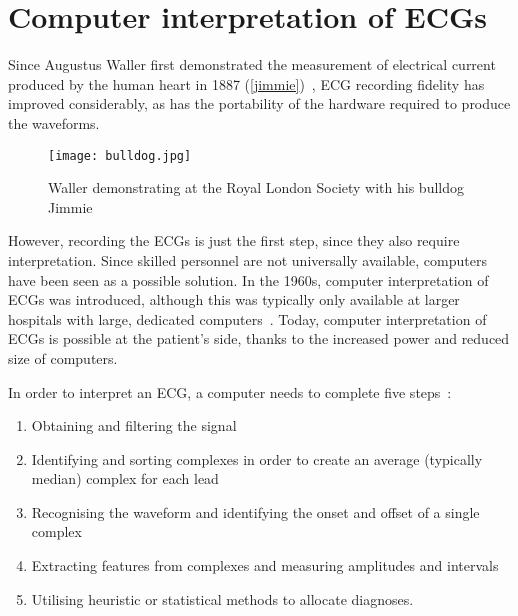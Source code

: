 \section{Computer interpretation of ECGs}
\label{computerinterpretationofecgs}

Since Augustus Waller first demonstrated the measurement of electrical current produced by the human heart in 1887 (\autoref{jimmie})~\citep{waller_demonstration_1887,herring_ecg_2006}, ECG recording fidelity has improved considerably, as has the portability of the hardware required to produce the waveforms. 

\begin{figure}[htbp]
\centering
\texttt{[image: bulldog.jpg]}
\caption{Waller demonstrating at the Royal London Society with his bulldog Jimmie}
\label{jimmie}
\end{figure}



However, recording the ECGs is just the first step, since they also require interpretation. Since skilled personnel are not universally available, computers have been seen as a possible solution. In the 1960s, computer interpretation of ECGs was introduced, although this was typically only available at larger hospitals with large, dedicated computers~\citep{willems_computer_1981}. Today, computer interpretation of ECGs is possible at the patient's side, thanks to the increased power and reduced size of computers.

In order to interpret an ECG, a computer needs to complete five steps~\citep{kligfield_recommendations_2007}:

\begin{enumerate}
\item Obtaining and filtering the signal

\item Identifying and sorting complexes in order to create an average (typically median) complex for each lead

\item Recognising the waveform and identifying the onset and offset of a single complex

\item Extracting features from complexes and measuring amplitudes and intervals

\item Utilising heuristic or statistical methods to allocate diagnoses.

\end{enumerate}

